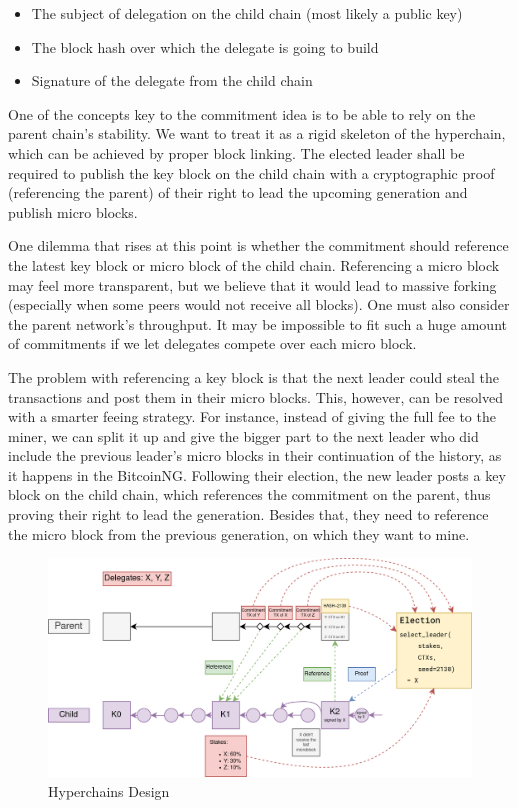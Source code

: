 \begin{itemize}
\item The subject of delegation on the child chain (most likely a public key)
\item The block hash over which the delegate is going to build
\item Signature of the delegate from the child chain
\end{itemize}

One of the concepts key to the commitment idea is to be able to rely on the
parent chain's stability. We want to treat it as a rigid skeleton of the
hyperchain, which can be achieved by proper block linking. The elected leader
shall be required to publish the key block on the child chain with a
cryptographic proof (referencing the parent) of their right to lead the upcoming
generation and publish micro blocks.

One dilemma that rises at this point is whether the commitment should reference
the latest key block or micro block of the child chain. Referencing a micro
block may feel more transparent, but we believe that it would lead to massive
forking (especially when some peers would not receive all blocks). One
must also consider the parent network's throughput. It may be impossible to fit
such a huge amount of commitments if we let delegates compete over each micro
block.

The problem with referencing a key block is that the next leader could steal the
transactions and post them in their micro blocks. This, however, can be resolved
with a smarter feeing strategy. For instance, instead of giving the full fee to
the miner, we can split it up and give the bigger part to the next leader who
did include the previous leader's micro blocks in their continuation of the
history, as it happens in the BitcoinNG\cite{incentive_bcng}. Following their
election, the new leader posts a key block on the child chain, which references
the commitment on the parent, thus proving their right to lead the generation.
Besides that, they need to reference the micro block from the previous
generation, on which they want to mine.

\begin{figure}[h]
	\caption{Hyperchains Design}
	\centering
	\includegraphics[scale=0.4]{hyperchains_design}
\end{figure}
